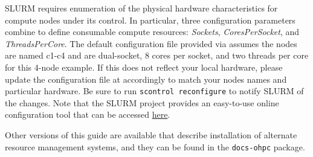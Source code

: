 \begin{center}
\begin{tcolorbox}[]
  \small SLURM requires enumeration of the physical hardware characteristics for
  compute nodes under its control. In particular, three configuration parameters
  combine to define consumable compute resources: {\em Sockets}, {\em
  CoresPerSocket}, and {\em ThreadsPerCore}. The default configuration file
  provided via \OHPC{} assumes the nodes are named c1-c4 and are dual-socket, 8
  cores per socket, and two threads per core for this 4-node example. If this
  does not reflect your local hardware, please update the configuration file at
   accordingly to match your nodes names and
  particular hardware. Be sure to run \texttt{scontrol reconfigure} to notify
  SLURM of the changes. Note that the SLURM project provides an easy-to-use
  online configuration tool that can be accessed
  \href{https://slurm.schedmd.com/configurator.html}{\color{blue} here}.
\end{tcolorbox}
\end{center}


Other versions of this guide are available that describe installation of alternate
resource management systems, and they can be found in the \texttt{docs-ohpc}
package.


